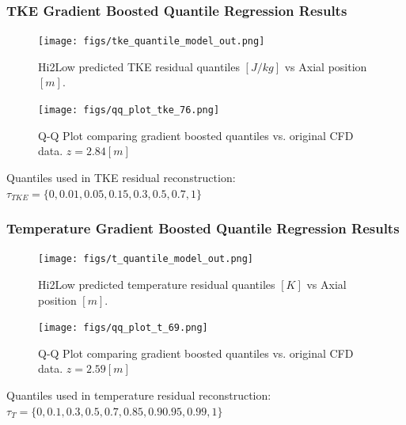 \documentclass[t, pdftex]{beamer}
\begin{document}
\begin{frame}\frametitle{TKE Gradient Boosted Quantile Regression Results}
    \begin{figure}
        \centering
        \begin{minipage}{.5\textwidth}
            \centering
            \texttt{[image: figs/tke\_quantile\_model\_out.png]}
            \caption{Hi2Low predicted TKE residual quantiles $[J/kg]$ vs Axial position $[m]$.}
        \end{minipage}%
        \begin{minipage}{.5\textwidth}
            \centering
            \texttt{[image: figs/qq\_plot\_tke\_76.png]}
            \caption{Q-Q Plot comparing gradient boosted quantiles vs. original CFD data. $z=2.84[m]$}
        \end{minipage}
    \end{figure}
Quantiles used in TKE residual reconstruction: $\tau_{TKE}=\{0, 0.01, 0.05, 0.15, 0.3, 0.5, 0.7, 1\}$
\end{frame}

\begin{frame}\frametitle{Temperature Gradient Boosted Quantile Regression Results}
    \begin{figure}
        \centering
        \begin{minipage}{.5\textwidth}
            \centering
            \texttt{[image: figs/t\_quantile\_model\_out.png]}
            \caption{Hi2Low predicted temperature residual quantiles $[K]$ vs Axial position $[m]$.}
        \end{minipage}%
        \begin{minipage}{.5\textwidth}
            \centering
            \texttt{[image: figs/qq\_plot\_t\_69.png]}
            \caption{Q-Q Plot comparing gradient boosted quantiles vs. original CFD data. $z=2.59[m]$}
        \end{minipage}
    \end{figure}
Quantiles used in temperature residual reconstruction: $\tau_{T}=\{0, 0.1, 0.3, 0.5, 0.7, 0.85, 0.9 0.95, 0.99, 1\}$
\end{frame}
\end{document}
